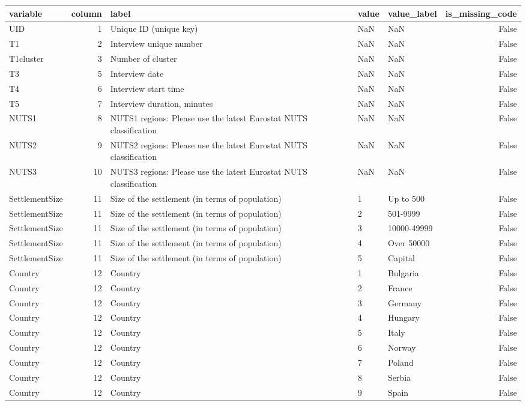 \begin{tabular}{lrlllr}
\toprule
variable & column & label & value & value_label & is_missing_code \\
\midrule
UID & 1 & Unique ID (unique key) & NaN & NaN & False \\
T1 & 2 & Interview unique number & NaN & NaN & False \\
T1cluster & 3 & Number of cluster & NaN & NaN & False \\
T3 & 5 & Interview date & NaN & NaN & False \\
T4 & 6 & Interview start time & NaN & NaN & False \\
T5 & 7 & Interview duration, minutes & NaN & NaN & False \\
NUTS1 & 8 & NUTS1 regions: Please use the latest Eurostat NUTS classification & NaN & NaN & False \\
NUTS2 & 9 & NUTS2 regions: Please use the latest Eurostat NUTS classification & NaN & NaN & False \\
NUTS3 & 10 & NUTS3 regions: Please use the latest Eurostat NUTS classification & NaN & NaN & False \\
SettlementSize & 11 & Size of the settlement (in terms of population) & 1 & Up to 500 & False \\
SettlementSize & 11 & Size of the settlement (in terms of population) & 2 & 501-9999 & False \\
SettlementSize & 11 & Size of the settlement (in terms of population) & 3 & 10000-49999 & False \\
SettlementSize & 11 & Size of the settlement (in terms of population) & 4 & Over 50000 & False \\
SettlementSize & 11 & Size of the settlement (in terms of population) & 5 & Capital & False \\
Country & 12 & Country & 1 & Bulgaria & False \\
Country & 12 & Country & 2 & France & False \\
Country & 12 & Country & 3 & Germany & False \\
Country & 12 & Country & 4 & Hungary & False \\
Country & 12 & Country & 5 & Italy & False \\
Country & 12 & Country & 6 & Norway & False \\
Country & 12 & Country & 7 & Poland & False \\
Country & 12 & Country & 8 & Serbia & False \\
Country & 12 & Country & 9 & Spain & False \\

\end{tabular}
